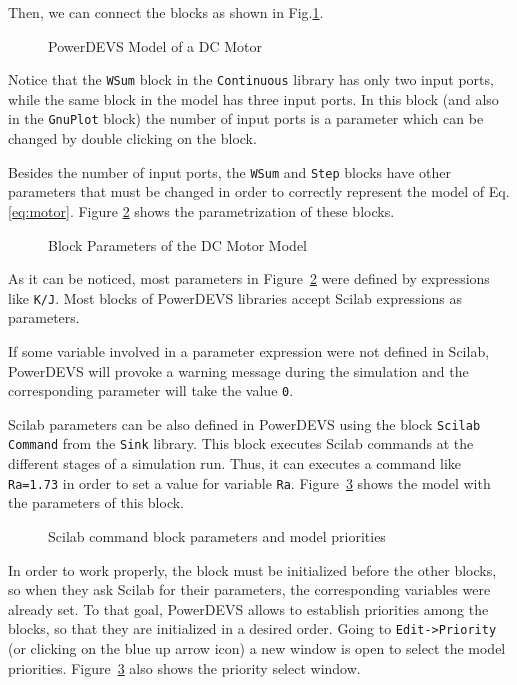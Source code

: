 Then, we can connect the blocks as shown in Fig.\ref{fig:db_motor}. 

\begin{figure}[h]
 \caption{PowerDEVS Model of a DC Motor}
 \label{fig:db_motor}
\end{figure}

Notice that the \verb"WSum" block in the \verb"Continuous" library has only two input ports, while the same block in the model has three input ports. In this block (and also in the \verb"GnuPlot" block) the number of input ports is a parameter which can be changed by double clicking on the block.

Besides the number of input ports, the \verb"WSum" and \verb"Step" blocks have other parameters that must be changed in order to correctly represent the model of Eq.\eqref{eq:motor}. Figure \ref{fig:motor_pars} shows the parametrization of these blocks.

\begin{figure}[h]
 \caption{Block Parameters of the DC Motor Model}
 \label{fig:motor_pars}
\end{figure}
 
As it can be noticed, most parameters in Figure~\ref{fig:motor_pars} were defined by expressions like \verb"K/J". Most blocks of PowerDEVS libraries accept Scilab expressions as parameters. 

If some variable involved in a parameter expression were not defined in Scilab, PowerDEVS will provoke a warning message during the simulation and the corresponding parameter will take the value \verb"0".

Scilab parameters can be also defined in PowerDEVS using the block \verb"Scilab Command" from the \verb"Sink" library. This block executes Scilab commands at the different stages of a simulation run. Thus, it can executes a command like \verb"Ra=1.73" in order to set a value for variable \verb"Ra". Figure~\ref{fig:motor_prior} shows the model with the parameters of this block. 

\begin{figure}[h]
 \caption{Scilab command block parameters and model priorities}
 \label{fig:motor_prior}
\end{figure}

In order to work properly, the block must be initialized before the other blocks, so when they ask Scilab for their parameters, the corresponding variables were already set. To that goal, PowerDEVS allows to establish priorities among the blocks, so that they are initialized in a desired order. Going to \verb"Edit->Priority" (or clicking on the blue up arrow icon) a new window is open to select the model priorities. Figure~\ref{fig:motor_prior} also shows the priority select window.    

